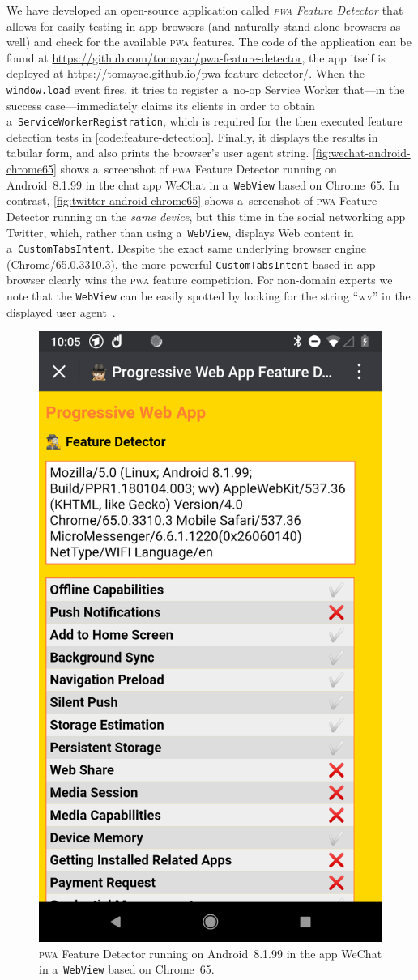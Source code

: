 \documentclass[sigconf]{acmart}
\begin{document}
We have developed an open-source application called \emph{\textsc{pwa} Feature Detector}
that allows for easily testing in-app browsers (and naturally stand-alone browsers as well)
and check for the available \textsc{pwa} features.
The code of the application can be found at
\url{https://github.com/tomayac/pwa-feature-detector},
the app itself is deployed at \url{https://tomayac.github.io/pwa-feature-detector/}.
When the \texttt{window.load} event fires,
it tries to register a~no-op Service Worker
that---in the success case---immediately claims its clients
in order to obtain a~\texttt{ServiceWorkerRegistration},
which is required for the then executed feature detection tests
in \autoref{code:feature-detection}.
Finally, it displays the results in tabular form,
and also prints the browser's user agent string.
\autoref{fig:wechat-android-chrome65} shows a~screenshot of \textsc{pwa} Feature Detector
running on Android~8.1.99 in the chat app WeChat in a~\texttt{WebView} based on Chrome~65.
In contrast, \autoref{fig:twitter-android-chrome65} shows
a~screenshot of \textsc{pwa} Feature Detector
running on the \emph{same device}, but this time in the social networking app Twitter,
which, rather than using a~\texttt{WebView},
displays Web content in a~\texttt{CustomTabsIntent}.
Despite the exact same underlying browser engine (Chrome/65.0.3310.3),
the more powerful \texttt{CustomTabsIntent}-based in-app browser
clearly wins the \textsc{pwa} feature competition.
For non-domain experts we note that the \texttt{WebView}
can be easily spotted by looking for the string
``wv'' in the displayed user agent~\cite{chrome2018useragent}.

\begin{figure}[t]
  \centering
  \includegraphics[width=.5\columnwidth,frame]{pwa-feature-detector-wechat-android-chrome65}
  \caption[\textsc{pwa} Feature Detector running in WeChat.]{
    \textsc{pwa} Feature Detector running on Android~8.1.99 in the app WeChat
    in a~\texttt{WebView} based on Chrome~65.}
  \label{fig:wechat-android-chrome65}
\end{figure}
\end{document}
